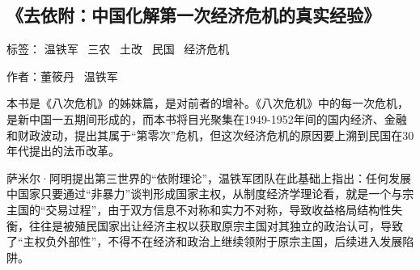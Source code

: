 \subsection{《去依附：中国化解第一次经济危机的真实经验》}

标签： 温铁军  \ 三农  \ 土改 \ 民国 \ 经济危机

作者：董筱丹 \ 温铁军

本书是《八次危机》的姊妹篇，是对前者的增补。《八次危机》中的每一次危机，是新中国一五期间形成的，而本书将目光聚集在1949-1952年间的国内经济、金融和财政波动，提出其属于“第零次”危机，但这次经济危机的原因要上溯到民国在30年代提出的法币改革。

萨米尔·阿明提出第三世界的“依附理论”，温铁军团队在此基础上指出：任何发展中国家只要通过“非暴力”谈判形成国家主权，从制度经济学理论看，就是一个与宗主国的“交易过程”，由于双方信息不对称和实力不对称，导致收益格局结构性失衡，往往是被殖民国家出让经济主权以获取原宗主国对其独立的政治认可，导致了“主权负外部性”，不得不在经济和政治上继续领附于原宗主国，后续进入发展陷阱。

